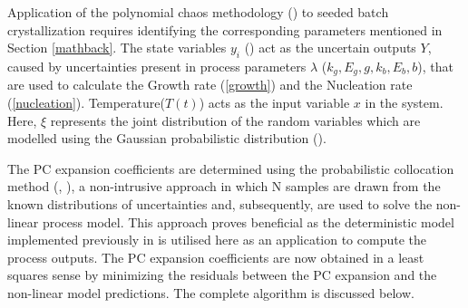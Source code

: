 \documentclass[3p,times,authoryear]{elsarticle}
\begin{document}
Application of the polynomial chaos methodology (\cite{streif2014stochastic}) to seeded batch crystallization requires identifying the corresponding parameters mentioned in Section \ref{mathback}. The state variables $y_{i}$ () act as the uncertain outputs $Y$, caused by uncertainties present in process parameters $\lambda$ ($k_{g}, E_{g}, g, k_{b}, E_{b}, b$), that are used to calculate the Growth rate (\ref{growth}) and the Nucleation rate (\ref{nucleation}). Temperature($T(t)$) acts as the input variable $x$ in the system. Here, $\xi$ represents the joint distribution of the random variables which are modelled using the Gaussian probabilistic distribution (\cite{yenkie}). 
\par
The PC expansion coefficients are determined using the probabilistic collocation method (\cite{mesbah2014active}, \cite{nagy}), a non-intrusive approach in which N samples are drawn from the known distributions of uncertainties and, subsequently, are used to solve the non-linear process model. This approach proves beneficial as the deterministic model implemented previously in is utilised here as an application to compute the process outputs. The PC expansion coefficients are now obtained in a least squares sense by minimizing the residuals between the PC expansion and the non-linear model predictions. The complete algorithm is discussed below.
\end{document}
